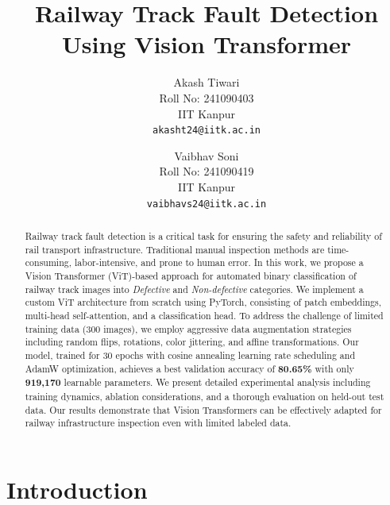 \documentclass[10pt,twocolumn,letterpaper]{article}
\begin{document}
\title{Railway Track Fault Detection Using Vision Transformer}

\author{
Akash Tiwari \\
Roll No: 241090403\\
IIT Kanpur\\
{\tt\small akasht24@iitk.ac.in}
\and
Vaibhav Soni\\
Roll No: 241090419\\
IIT Kanpur\\
{\tt\small vaibhavs24@iitk.ac.in}
}

\maketitle

\begin{abstract}
Railway track fault detection is a critical task for ensuring the safety and reliability of rail transport infrastructure. Traditional manual inspection methods are time-consuming, labor-intensive, and prone to human error. In this work, we propose a Vision Transformer (ViT)-based approach for automated binary classification of railway track images into \textit{Defective} and \textit{Non-defective} categories. We implement a custom ViT architecture from scratch using PyTorch, consisting of patch embeddings, multi-head self-attention, and a classification head. To address the challenge of limited training data (300 images), we employ aggressive data augmentation strategies including random flips, rotations, color jittering, and affine transformations. Our model, trained for 30 epochs with cosine annealing learning rate scheduling and AdamW optimization, achieves a best validation accuracy of \textbf{80.65\%} with only \textbf{919,170} learnable parameters. We present detailed experimental analysis including training dynamics, ablation considerations, and a thorough evaluation on held-out test data. Our results demonstrate that Vision Transformers can be effectively adapted for railway infrastructure inspection even with limited labeled data.
\end{abstract}


\section{Introduction}
\label{sec:intro}
\end{document}
